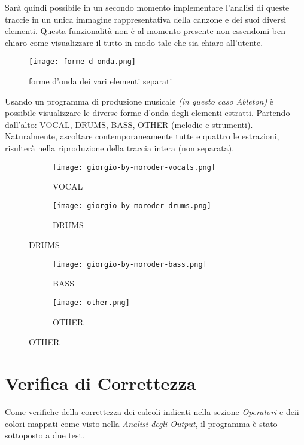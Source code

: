 \documentclass{article}
\begin{document}
Sarà quindi possibile in un secondo momento implementare l'analisi di queste traccie in un unica immagine rappresentativa della canzone e dei suoi diversi elementi. Questa funzionalità non è al momento presente non essendomi ben chiaro come visualizzare il tutto in modo tale che sia chiaro all'utente.
\newpage
\begin{figure}[h]
    \centering
    \texttt{[image: forme-d-onda.png]}
    \caption{forme d'onda dei vari elementi separati}
    \label{fig:forme-donda}
\end{figure}
Usando un programma di produzione musicale \textit{(in questo caso Ableton)} è possibile visualizzare le diverse forme d'onda degli elementi estratti. Partendo dall'alto: VOCAL, DRUMS, BASS, OTHER (melodie e strumenti).
Naturalmente, ascoltare contemporaneamente tutte e quattro le estrazioni, risulterà nella riproduzione della traccia intera (non separata).

\begin{figure}[h]
    \centering
    \begin{subfigure}{0.5\linewidth}
        \centering
        \texttt{[image: giorgio-by-moroder-vocals.png]}
        \caption{VOCAL}
        \label{fig:vocal}
    \end{subfigure}%
    \begin{subfigure}{0.5\linewidth}
        \centering
        \texttt{[image: giorgio-by-moroder-drums.png]}
        \caption{DRUMS}
        \label{fig:enter-label}
    \end{subfigure}
\end{figure}
\begin{figure}[h]
    \centering
    \begin{subfigure}{0.5\linewidth}
        \centering
        \texttt{[image: giorgio-by-moroder-bass.png]}
        \caption{BASS}
        \label{fig:enter-label}
    \end{subfigure}%
    \begin{subfigure}{0.5\linewidth}
        \centering
        \texttt{[image: other.png]}
        \caption{OTHER}
        \label{fig:enter-label}
    \end{subfigure}
\end{figure}
\newpage
\section{Verifica di Correttezza}
\label{sec:verifica-correttezza}
Come verifiche della correttezza dei calcoli indicati nella sezione \hyperref[sec:operatori]{\textit{Operatori}} e deii colori mappati come visto nella \hyperref[sec:analisi-output]{\textit{Analisi degli Output}}, il programma è stato sottoposto a due test.
\end{document}

